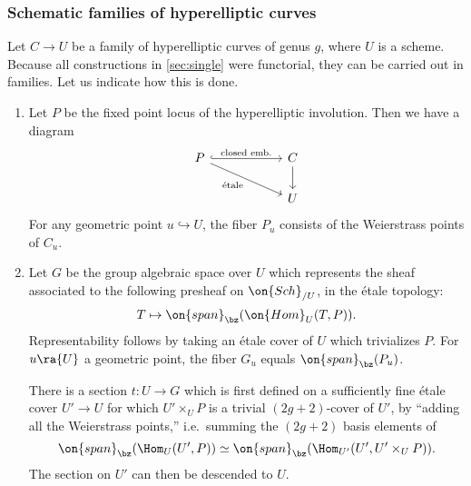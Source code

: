 \subsubsection{Schematic families of hyperelliptic curves} \label{part2}
Let ${C} \to {U}$ be a family of hyperelliptic curves of genus $g$, where $U$ is a scheme. Because all constructions in \ref{sec:single} were functorial, they can be carried out in families. Let us indicate how this is done.
\begin{enumerate}[itemsep=0.25cm]
	\item Let ${P}$ be the fixed point locus of the hyperelliptic involution. Then we have a diagram
	\[
	\begin{tikzcd}[column sep = 2 cm]
	{P} \ar[hookrightarrow]{r}{\text{closed emb.}} \ar[swap]{rd}{\text{\'etale}} & {C} \ar{d} \\
	& {U}
	\end{tikzcd}
	\]
	For any geometric point $u \hookrightarrow {U}$, the fiber ${P}_u$ consists of the Weierstrass points of ${C}_u$.
	\item Let ${G}$ be the group algebraic space over ${U}$ which represents the sheaf associated to the following presheaf on $\on{Sch}_{/{U}}$, in the \'etale topology:
	\[
	T \mapsto \on{span}_\bz (\on{Hom}_{{U}}(T, {P})).
	\]
	Representability follows by taking an \'etale cover of ${U}$ which trivializes ${P}$. For $u \ra {U}$ a geometric point, the fiber ${G}_u$ equals $\on{span}_\bz({P}_u)$.
	
	There is a section $t \colon {U} \to {G}$ which is first defined on a sufficiently fine \'etale cover ${U}' \to {U}$ for which $U' \times_U P$ is a trivial $(2g+2)$-cover of $U'$, by ``adding all the Weierstrass points,'' i.e.\ summing the $(2g+2)$ basis elements of
	\[
		\on{span}_\bz(\Hom_U(U', P)) \simeq \on{span}_\bz(\Hom_{U'}(U', U' \times_U P)).
	\]
	The section on $U'$ can then be descended to $U$.
	

\end{enumerate}
